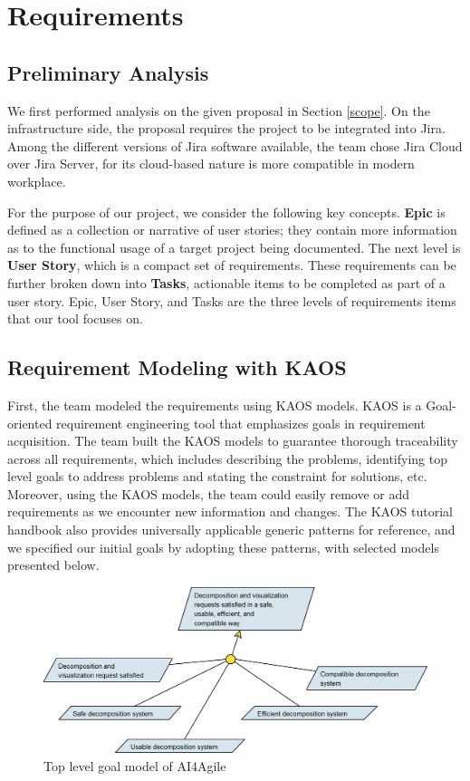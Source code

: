 \section{Requirements}
\label{requirement}

\subsection{Preliminary Analysis}
We first performed analysis on the given proposal in Section \ref{scope}. On the infrastructure side, the proposal requires the project to be integrated into Jira. Among the different versions of Jira software available, the team chose Jira Cloud over Jira Server, for its cloud-based nature is more compatible in modern workplace. 

For the purpose of our project, we consider the following key concepts. 
\textbf{Epic} is defined as a collection or narrative of user stories; they contain more information as to the functional usage of a target project being documented. The next level is \textbf{User Story}, which is a compact set of requirements. These requirements can be further broken down into \textbf{Tasks}, actionable items to be completed as part of a user story. 
Epic, User Story, and Tasks are the three levels of requirements items that our tool focuses on. 

\subsection{Requirement Modeling with KAOS}
First, the team modeled the requirements using KAOS models\cite{KAOS}. KAOS is a Goal-oriented requirement engineering \cite{GOAL} tool that emphasizes goals in requirement acquisition. The team built the KAOS models to guarantee thorough traceability across all requirements, which includes describing the problems, identifying top level goals to address problems and stating the constraint for solutions, etc. Moreover, using the KAOS models, the team could easily remove or add requirements as we encounter new information and changes. The KAOS tutorial handbook \cite{KAOS} also provides universally applicable generic patterns for reference, and we specified our initial goals by adopting these patterns, with selected models presented below.

\begin{figure}
\centering
\includegraphics[width=\textwidth,keepaspectratio]{./figure/GoalsNFR1.png}
\caption{Top level goal model of AI4Agile}
\label{goal1}
\end{figure}

